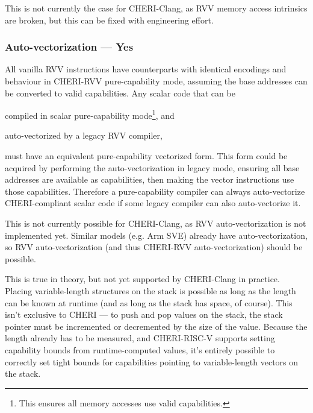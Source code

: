 This is not currently the case for CHERI-Clang, as RVV memory access intrinsics are broken, but this can be fixed with engineering effort.

\subsubsection*{Auto-vectorization --- Yes}
All vanilla RVV instructions have counterparts with identical encodings and behaviour in CHERI-RVV pure-capability mode, assuming the base addresses can be converted to valid capabilities.
Any scalar code that can be 
\begin{enumerate*}[label=\alph*)]
    \item compiled in scalar pure-capability mode\footnote{This ensures all memory accesses use valid capabilities.}, and
    \item auto-vectorized by a legacy RVV compiler,
\end{enumerate*}
must have an equivalent pure-capability vectorized form.
This form could be acquired by performing the auto-vectorization in legacy mode, ensuring all base addresses are available as capabilities, then making the vector instructions use those capabilities.
Therefore a pure-capability compiler can always auto-vectorize CHERI-compliant scalar code if some legacy compiler can also auto-vectorize it.

This is not currently possible for CHERI-Clang, as RVV auto-vectorization is not implemented yet.
Similar models (e.g. Arm SVE) already have auto-vectorization, so RVV auto-vectorization (and thus CHERI-RVV auto-vectorization) should be possible.

{}
This is true in theory, but not yet supported by CHERI-Clang in practice.
Placing variable-length structures on the stack is possible as long as the length can be known at runtime (and as long as the stack has space, of course).
This isn't exclusive to CHERI --- to push and pop values on the stack, the stack pointer must be incremented or decremented by the size of the value.
Because the length already has to be measured, and CHERI-RISC-V supports setting capability bounds from runtime-computed values, it's entirely possible to correctly set tight bounds for capabilities pointing to variable-length vectors on the stack.


